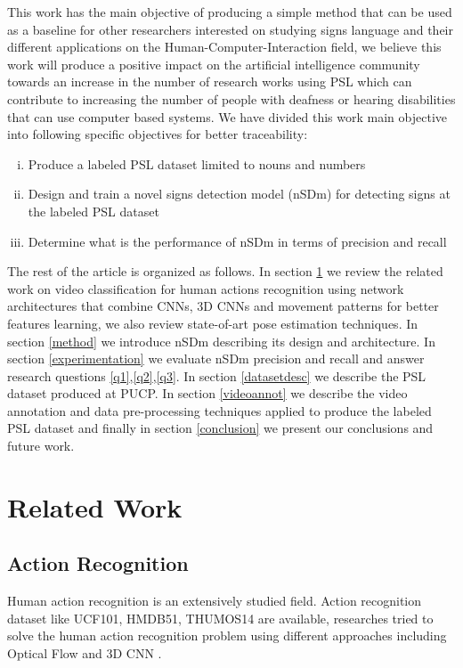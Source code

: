 \documentclass[twocolumn,conference]{article}
\begin{document}
This work has the main objective of producing a simple method that can be used as a baseline for other researchers interested on studying signs language and their different applications on the Human-Computer-Interaction field, we believe this work will produce a positive impact on the artificial intelligence community towards an increase in the number of research works using PSL which can contribute to increasing the number of people with deafness or hearing disabilities that can use computer based systems. We have divided this work main objective into following specific objectives for better traceability:

\begin{enumerate}[(i)]
\item Produce a labeled PSL dataset limited to nouns and numbers\label{o1}
\item Design and train a novel signs detection model (nSDm) for detecting signs at the labeled PSL dataset\label{o2}
\item Determine what is the performance of nSDm in terms of precision and recall\label{o3}
\end{enumerate}

The rest of the article is organized as follows. In section \ref{relatedwork} we review the related work on video classification for human actions recognition using network architectures that combine CNNs, 3D CNNs and movement patterns  for better features learning, we also review state-of-art pose estimation techniques. In section \ref{method} we introduce nSDm describing its design and architecture. In section \ref{experimentation} we evaluate nSDm precision and recall and answer research questions \ref{q1},\ref{q2},\ref{q3}. In section \ref{datasetdesc} we describe the PSL dataset produced at PUCP. In section \ref{videoannot} we describe the video annotation and data pre-processing techniques applied to produce the labeled PSL dataset and finally in section \ref{conclusion} we present our conclusions and future work.
\section{Related Work} \label{relatedwork}
\subsection{Action Recognition}
Human action recognition is an extensively studied field. Action recognition dataset like UCF101, HMDB51, THUMOS14  are available, researches tried to solve the human action recognition problem using different approaches including Optical Flow and 3D CNN \cite{qiu2017learning}.
\end{document}

